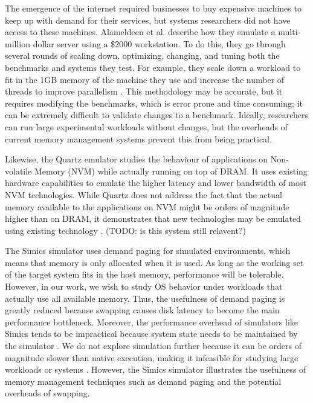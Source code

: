 \documentclass[twocolumn,11pt]{article}
\begin{document}
The emergence of the internet required businesses to buy expensive machines to
keep up with demand for their services, but systems researchers did not have
access to these machines. Alameldeen et al. describe how they simulate a
multi-million dollar server using a \$2000 workstation. To do this, they go
through several rounds of scaling down, optimizing, changing, and tuning both
the benchmarks and systems they test. For example, they scale down a workload to
fit in the 1GB memory of the machine they use and increase the number of threads
to improve parallelism \cite{2kmachine}. This methodology may be accurate, but
it requires modifying the benchmarks, which is error prone and time consuming;
it can be extremely difficult to validate changes to a benchmark. Ideally,
researchers can run large experimental workloads without changes, but the overheads
of current memory management systems prevent this from being practical.

Likewise, the Quartz emulator studies the behaviour of applications on
Non-volatile Memory (NVM) while actually running on top of DRAM. It uses
existing hardware capabilities to emulate the higher latency and lower bandwidth
of most NVM technologies. While Quartz does not address the fact that the actual
memory available to the applications on NVM might be orders of magnitude higher
than on DRAM, it demonstrates that new technologies may be emulated using
existing technology \cite{quartz}. (TODO: is this system still relavent?)

The Simics simulator uses demand paging for simulated environments, which means
that memory is only allocated when it is used. As long as the working set of
the target system fits in the host memory, performance will be tolerable.
However, in our work, we wish to study OS behavior under workloads that
actually use all available memory. Thus, the usefulness of demand paging is
greatly reduced because swapping causes disk latency to become the main
performance bottleneck. Moreover, the performance overhead of simulators like
Simics tends to be impractical because system state needs to be maintained by
the simulator \cite{simics}. We do not explore simulation further because it
can be orders of magnitude slower than native execution, making it infeasible
for studying large workloads or systems \cite{2kmachine}. However, the Simics
simulator illustrates the usefulness of memory management techniques such as
demand paging and the potential overheads of swapping.
\end{document}
